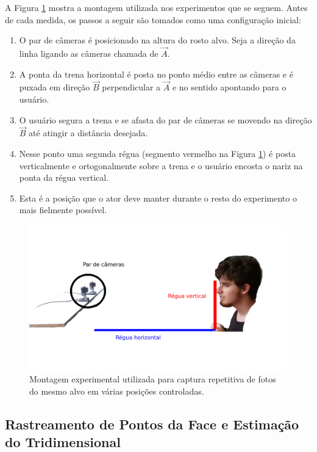 A Figura \ref{fig:exp-montagem} mostra a montagem utilizada nos experimentos que
se seguem. Antes de cada medida, os passos a seguir são tomados como uma
configuração inicial:

\begin{enumerate}

\item O par de câmeras é posicionado na altura do rosto alvo. Seja a direção da
  linha ligando as câmeras chamada de $\vec{A}$.

\item A ponta da trena horizontal é posta no ponto médio entre as câmeras e é
  puxada em direção $\vec{B}$ perpendicular a $\vec{A}$ e no sentido apontando
  para o usuário.

\item O usuário segura a trena e se afasta do par de câmeras se movendo na
  direção $\vec{B}$ até atingir a distância desejada.

\item Nesse ponto uma segunda régua (segmento vermelho na Figura
  \ref{fig:exp-montagem}) é posta verticalmente e ortogonalmente sobre a trena e
  o usuário encosta o nariz na ponta da régua vertical. 

\item Esta é a posição que o ator deve manter durante o resto do experimento o
  mais fielmente possível.

\end{enumerate}

\begin{figure}[!htp]
\centering
\includegraphics[width=0.8\linewidth]{figs/setupExperimento-comentado-fundo-branco.png}
\caption{Montagem experimental utilizada para captura repetitiva de fotos do mesmo alvo em várias posições controladas.}
\label{fig:exp-montagem}
\end{figure}

\subsection{Rastreamento de Pontos da Face e Estimação do Tridimensional}

